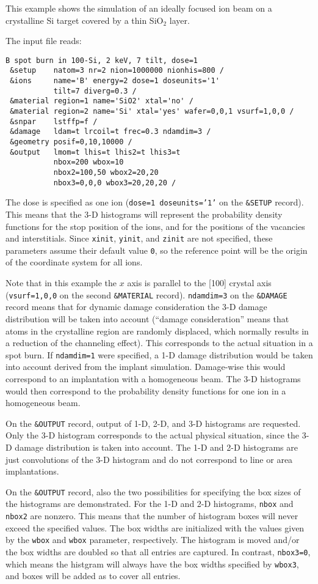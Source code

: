 This example shows the simulation of an ideally focused ion beam on a
crystalline Si target covered by a thin SiO$_2$ layer.

The input file reads:

\begin{verbatim}
B spot burn in 100-Si, 2 keV, 7 tilt, dose=1
 &setup    natom=3 nr=2 nion=1000000 nionhis=800 / 
 &ions     name='B' energy=2 dose=1 doseunits='1'
           tilt=7 diverg=0.3 /
 &material region=1 name='SiO2' xtal='no' /
 &material region=2 name='Si' xtal='yes' wafer=0,0,1 vsurf=1,0,0 /
 &snpar    lstffp=f /
 &damage   ldam=t lrcoil=t frec=0.3 ndamdim=3 /
 &geometry posif=0,10,10000 /
 &output   lmom=t lhis=t lhis2=t lhis3=t 
           nbox=200 wbox=10
           nbox2=100,50 wbox2=20,20 
           nbox3=0,0,0 wbox3=20,20,20 /
\end{verbatim}

The dose is specified as one ion (\texttt{dose=1 doseunits='1'} on the
\texttt{\&SETUP} record). This means that the 3-D histograms will represent the
probability density functions for the stop position of the ions, and for the
positions of the vacancies and interstitials. Since \texttt{xinit},
\texttt{yinit}, and \texttt{zinit} are not specified, these parameters assume
their default value \texttt{0}, so the reference point will be the origin of the
coordinate system for all ions.

Note that in this example the $x$ axis is parallel to the [100] crystal axis
(\texttt{vsurf=1,0,0} on the second \texttt{\&MATERIAL} record).
\texttt{ndamdim=3} on the \texttt{\&DAMAGE} record means that for dynamic damage
consideration the 3-D damage distribution will be taken into account (``damage
consideration'' means that atoms in the crystalline region are randomly
displaced, which normally results in a reduction of the channeling effect).
This corresponds to the actual situation in a spot burn. If \texttt{ndamdim=1}
were specified, a 1-D damage distribution would be taken into account derived from
the implant simulation. Damage-wise this would correspond to an implantation
with a homogeneous beam. The 3-D histograms would then correspond to the
probability density functions for one ion in a homogeneous beam.

On the \texttt{\&OUTPUT} record, output of 1-D, 2-D, and 3-D histograms are
requested. Only the 3-D histogram corresponds to the actual physical situation,
since the 3-D damage distribution is taken into account. The 1-D and 2-D
histograms are just convolutions of the 3-D histogram and do not correspond to
line or area implantations.

On the \texttt{\&OUTPUT} record, also the two possibilities for specifying the
box sizes of the histograms are demonstrated. For the 1-D and 2-D histograms,
\texttt{nbox} and \texttt{nbox2} are nonzero. This means that the number of
histogram boxes will never exceed the specified values. The box widths are
initialized with the values given by the \texttt{wbox} and \texttt{wbox}
parameter, respectively. The histogram is moved and/or the box widths are
doubled so that all entries are captured. In contrast, \texttt{nbox3=0}, which
means the histgram will always have the box widths specified by \texttt{wbox3},
and boxes will be added as to cover all entries.
